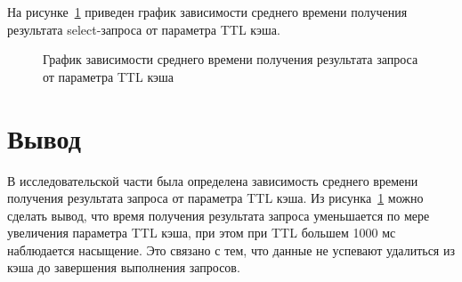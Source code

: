 На рисунке~\ref{ttl_time_graph} приведен график зависимости среднего времени получения результата select-запроса от параметра TTL кэша.
\begin{figure}[H]
	\begin{center}
		\caption{\label{ttl_time_graph}График зависимости среднего времени получения результата запроса от параметра TTL кэша}
	\end{center}
\end{figure}

\section{Вывод}

В исследовательской части была определена зависимость среднего времени получения результата запроса от параметра TTL кэша.
Из рисунка~\ref{ttl_time_graph} можно сделать вывод, что время получения результата запроса уменьшается по мере увеличения параметра TTL кэша, при этом при TTL большем 1000 мс наблюдается насыщение.
Это связано с тем, что данные не успевают удалиться из кэша до завершения выполнения запросов.

\clearpage
